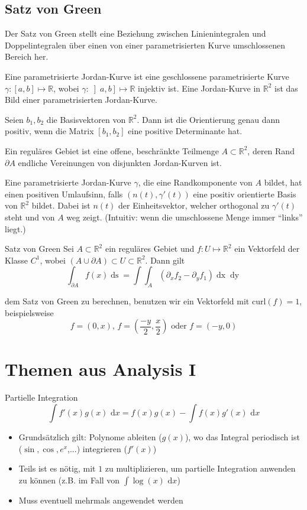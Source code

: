 \documentclass[a4paper,10pt]{article}
\def\R{\mathbb{R}}
\def\dx{\text{ d}x}
\begin{document}
\subsection{Satz von Green}
Der Satz von Green stellt eine Beziehung zwischen Linienintegralen und Doppelintegralen über einen von einer parametrisierten Kurve umschlossenen Bereich her. 

Eine parametrisierte Jordan-Kurve ist eine geschlossene parametrisierte Kurve \(\gamma : \left[a,b\right] \mapsto \R\), wobei \(\gamma : \left] a,b \right] \mapsto \R\) injektiv ist. Eine Jordan-Kurve in \(\R^2\) ist das Bild einer parametrisierten Jordan-Kurve.

Seien \(b_1, b_2\) die Basisvektoren von \(\R^2\). Dann ist die Orientierung genau dann positiv, wenn die Matrix \(\left[b_1, b_2\right]\) eine positive Determinante hat.

Ein reguläres Gebiet ist eine offene, beschränkte Teilmenge \(A\subset \R^2\), deren Rand \(\partial A\) endliche Vereinungen von disjunkten Jordan-Kurven ist.

Eine parametrisierte Jordan-Kurve \(\gamma\), die eine Randkomponente von \(A\) bildet, hat einen positiven Umlaufsinn, falls \((n(t), \gamma'(t))\) eine positiv orientierte Basis von \(\R^2\) bildet. Dabei ist \(n(t)\) der Einheitsvektor, welcher orthogonal zu \(\gamma'(t)\) steht und von \(A\) weg zeigt. (Intuitiv: wenn die umschlossene Menge immer ``links'' liegt.)

\begin{mainbox}{Satz von Green}
  Sei \(A \subset \R^2\) ein reguläres Gebiet und \(f: U \mapsto \R^2\) ein Vektorfeld der Klasse \(C^1\), wobei \((A \cup \partial A) \subset U \subset \R^2\). Dann gilt
  \[\int_{\partial A} f(x) \mathop{ds} = \int \int_A \left(\partial_x f_2 - \partial_y f_1\right) \mathop{dx} \mathop{dy}\]
\end{mainbox}
 dem Satz von Green zu berechnen, benutzen wir ein Vektorfeld mit \(\text{curl}(f) = 1\), beispielsweise \[f = (0,x) \text{, } f = (\frac{-y}{2}, \frac{x}{2}) \text{ oder } f = (-y, 0)\]

\section{Themen aus Analysis I}
\begin{mainbox}{Partielle Integration}
 $$\int f'(x) g(x) \dx = f(x)g(x) - \int f(x) g'(x) \dx$$
\end{mainbox}
\begin{itemize}
 \item Grundsätzlich gilt: Polynome ableiten ($g(x)$), wo das Integral periodisch ist ($\sin, \cos, e^x$,...) integrieren ($f'(x)$)
 \item Teils ist es nötig, mit $1$ zu multiplizieren, um partielle Integration anwenden zu können (z.B. im Fall von $\int \log(x) \dx$)
 \item Muss eventuell mehrmals angewendet werden
\end{itemize}
\end{document}
